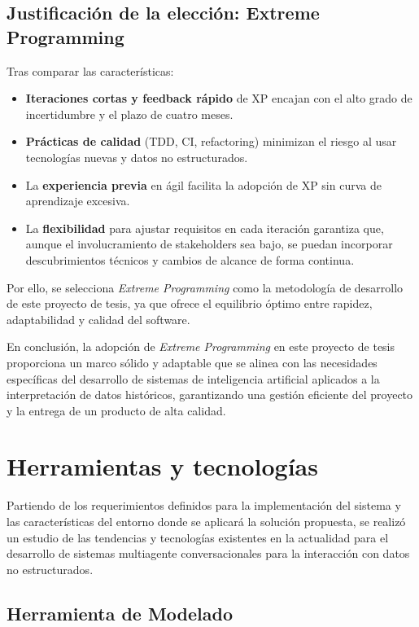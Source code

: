 \subsection{Justificación de la elección: Extreme Programming}
Tras comparar las características:

\begin{itemize}
	\item \textbf{Iteraciones cortas y feedback rápido} de XP encajan con el alto grado de incertidumbre y el plazo de cuatro meses.  
	\item \textbf{Prácticas de calidad} (TDD, CI, refactoring) minimizan el riesgo al usar tecnologías nuevas y datos no estructurados.  
	\item La \textbf{experiencia previa} en ágil facilita la adopción de XP sin curva de aprendizaje excesiva.  
	\item La \textbf{flexibilidad} para ajustar requisitos en cada iteración garantiza que, aunque el involucramiento de stakeholders sea bajo, se puedan incorporar descubrimientos técnicos y cambios de alcance de forma continua.
\end{itemize}

Por ello, se selecciona \textit{Extreme Programming} como la metodología de desarrollo de este proyecto de tesis, ya que ofrece el equilibrio óptimo entre rapidez, adaptabilidad y calidad del software.~\cite{agilealliance_xp}  

En conclusión, la adopción de \textit{Extreme Programming} en este proyecto de tesis proporciona un marco sólido y adaptable que se alinea con las necesidades específicas del desarrollo de sistemas de inteligencia artificial aplicados a la interpretación de datos históricos, garantizando una gestión eficiente del proyecto y la entrega de un producto de alta calidad.

\section{Herramientas y tecnologías}

Partiendo de los requerimientos definidos para la implementación del sistema y las características del entorno donde se aplicará la solución propuesta, se realizó un estudio de las tendencias y tecnologías existentes en la actualidad para el desarrollo de sistemas multiagente conversacionales para la interacción con datos no estructurados.

\subsection{Herramienta de Modelado}


